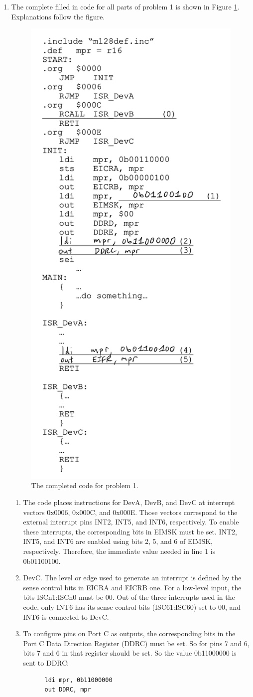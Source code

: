 \documentclass[11pt]{article}
\begin{document}
\begin{enumerate}[leftmargin=0.2in]

\item The complete filled in code for all parts of problem 1 is shown in Figure \ref{fig:p1}. Explanations follow the figure.

  \begin{figure}[H]
    \centering
    \includegraphics[width=0.35\linewidth]{p1.png}
    \caption{The completed code for problem 1.}
    \label{fig:p1}
  \end{figure}

  \begin{enumerate}
    \item The code places instructions for DevA, DevB, and DevC at interrupt vectors 0x0006, 0x000C, and 0x000E. Those vectors correspond to the external interrupt pins INT2, INT5, and INT6, respectively. To enable these interrupts, the corresponding bits in EIMSK must be set. INT2, INT5, and INT6 are enabled using bits 2, 5, and 6 of EIMSK, respectively. Therefore, the immediate value needed in line 1 is 0b01100100.

    \item DevC. The level or edge used to generate an interrupt is defined by the sense control bits in EICRA and EICRB one. For a low-level input, the bits ISCn1:ISCn0 must be 00. Out of the three interrupts used in the code, only INT6 has its sense control bits (ISC61:ISC60) set to 00, and INT6 is connected to DevC.

    \item To configure pins on Port C as outputs, the corresponding bits in the Port C Data Direction Register (DDRC) must be set. So for pins 7 and 6, bits 7 and 6 in that register should be set. So the value 0b11000000 is sent to DDRC:
      \begin{verbatim}
      ldi mpr, 0b11000000
      out DDRC, mpr
      \end{verbatim}


\end{enumerate}
\end{enumerate}
\end{document}
